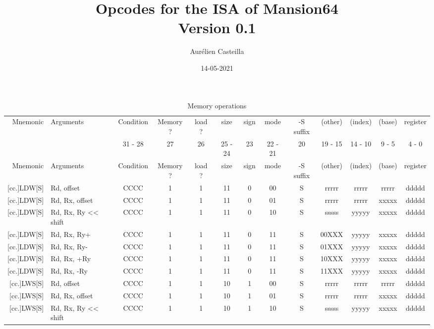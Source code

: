 \documentclass{article}
\author{Aurélien Casteilla}
\title{Opcodes for the ISA of Mansion64 \\[1ex] \large Version 0.1}
\date{14-05-2021}
\begin{document}
\maketitle
\newpage


\ttfamily
\begin{longtable}{|r|l|c|c|c|c|c|c|c|ccc|c|}
    \caption{Memory operations} \\
    \hline
    Mnemonic & Arguments & Condition & Memory ? & load ? & size & sign & mode & -S suffix & (other) & (index) & (base) & register \\
    & & 31 - 28 & 27 & 26 & 25 - 24 & 23 & 22 - 21 & 20 & 19 - 15 & 14 - 10 & 9 - 5 & 4 - 0 \\
    \hline
    \endfirsthead
    \hline
    Mnemonic & Arguments & Condition & Memory ? & load ? & size & sign & mode & -S suffix & (other) & (index) & (base) & register \\
    \hline
    \endhead
    \hline
    \endfoot
    \hline
    \endlastfoot
        {[}cc.]LDW[S] & Rd, offset & CCCC & 1 & 1 & 11 & 0 & 00 & S & rrrrr & rrrrr & rrrrr & ddddd \\
        {[}cc.]LDW[S] & Rd, Rx, offset & CCCC & 1 & 1 & 11 & 0 & 01 & S & rrrrr & rrrrr & xxxxx & ddddd \\
        {[}cc.]LDW[S] & Rd, Rx, Ry << shift & CCCC & 1 & 1 & 11 & 0 & 10 & S & sssss & yyyyy & xxxxx & ddddd \\
        {[}cc.]LDW[S] & Rd, Rx, Ry+ & CCCC & 1 & 1 & 11 & 0 & 11 & S & 00XXX & yyyyy & xxxxx & ddddd \\
        {[}cc.]LDW[S] & Rd, Rx, Ry- & CCCC & 1 & 1 & 11 & 0 & 11 & S & 01XXX & yyyyy & xxxxx & ddddd \\
        {[}cc.]LDW[S] & Rd, Rx, +Ry & CCCC & 1 & 1 & 11 & 0 & 11 & S & 10XXX & yyyyy & xxxxx & ddddd \\
        {[}cc.]LDW[S] & Rd, Rx, -Ry & CCCC & 1 & 1 & 11 & 0 & 11 & S & 11XXX & yyyyy & xxxxx & ddddd \\
        \hline %
        {[}cc.]LWS[S] & Rd, offset & CCCC & 1 & 1 & 10 & 1 & 00 & S & rrrrr & rrrrr & rrrrr & ddddd \\
        {[}cc.]LWS[S] & Rd, Rx, offset & CCCC & 1 & 1 & 10 & 1 & 01 & S & rrrrr & rrrrr & xxxxx & ddddd \\
        {[}cc.]LWS[S] & Rd, Rx, Ry << shift & CCCC & 1 & 1 & 10 & 1 & 10 & S & sssss & yyyyy & xxxxx & ddddd \\

\end{longtable}
\end{document}
